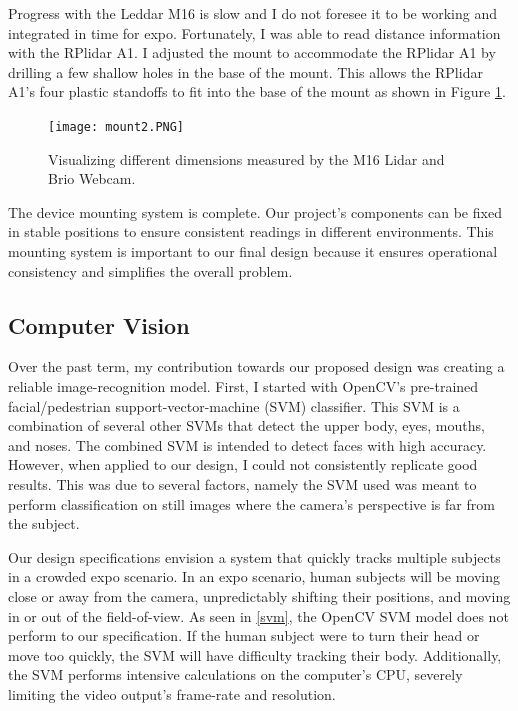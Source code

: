 \documentclass[onecolumn, draftclsnofoot,10pt, compsoc]{IEEEtran}
\makeatletter
\newcommand\captionof[1]{\def\@captype{#1}\caption}
\makeatother
\begin{document}
\begin{singlespace}
		Progress with the Leddar M16 is slow and I do not foresee it to be working and integrated in time for expo.
		Fortunately, I was able to read distance information with the RPlidar A1.
		I adjusted the mount to accommodate the RPlidar A1 by drilling a few shallow holes in the base of the mount.
		This allows the RPlidar A1's four plastic standoffs to fit into the base of the mount as shown in Figure \ref{mount2}.

		\begin{figure}[H]
			\texttt{[image: mount2.PNG]}
			\captionof{figure}{Visualizing different dimensions measured by the M16 Lidar and Brio Webcam.}
			\label{mount2}
		\end{figure}

		The device mounting system is complete. 
		Our project's components can be fixed in stable positions to ensure consistent readings in different environments.
		This mounting system is important to our final design because it ensures operational consistency and simplifies the overall problem. 


		\subsection{Computer Vision}
			Over the past term, my contribution towards our proposed design was creating a reliable image-recognition model.
			First, I started with OpenCV's pre-trained facial/pedestrian support-vector-machine (SVM) classifier.
			This SVM is a combination of several other SVMs that detect the upper body, eyes, mouths, and noses.
			The combined SVM is intended to detect faces with high accuracy.
			However, when applied to our design, I could not consistently replicate good results.
			This was due to several factors, namely the SVM used was meant to perform classification on still images where the camera's perspective is far from the subject.
			

			Our design specifications envision a system that quickly tracks multiple subjects in a crowded expo scenario.
			In an expo scenario, human subjects will be moving close or away from the camera, unpredictably shifting their positions, and moving in or out of the field-of-view.
			As seen in \ref{svm}, the OpenCV SVM model does not perform to our specification.
			If the human subject were to turn their head or move too quickly, the SVM will have difficulty tracking their body.
			Additionally, the SVM performs intensive calculations on the computer's CPU, severely limiting the video output's frame-rate and resolution.
			

\end{singlespace}
\end{document}
